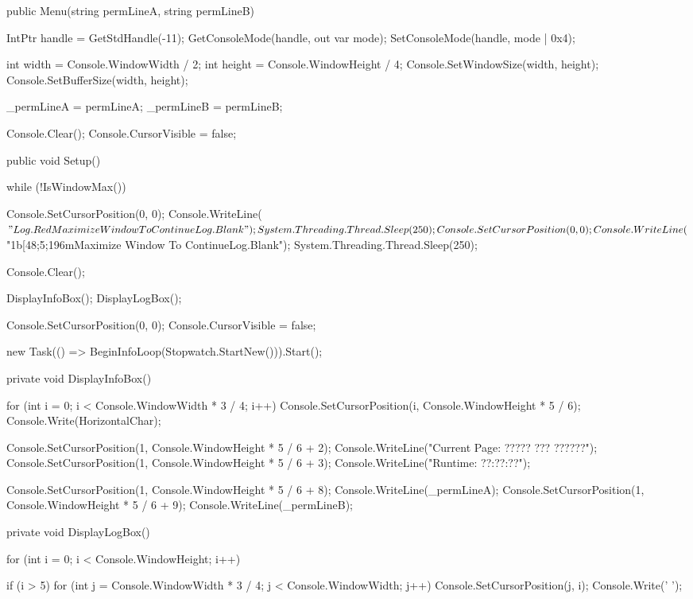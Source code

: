 \begin{flushleft}
\begin{cscode}
{    public Menu(string permLineA, string permLineB)
    {
        IntPtr handle = GetStdHandle(-11);
        GetConsoleMode(handle, out var mode);
        SetConsoleMode(handle, mode | 0x4);

        int width = Console.WindowWidth / 2;
        int height = Console.WindowHeight / 4;
        Console.SetWindowSize(width, height);
        Console.SetBufferSize(width, height);

        _permLineA = permLineA;
        _permLineB = permLineB;

        Console.Clear();
        Console.CursorVisible = false;
    }

    public void Setup()
    {
        while (!IsWindowMax())
        {
            Console.SetCursorPosition(0, 0);
            Console.WriteLine($"{Log.Red}Maximize Window To Continue{Log.Blank}");
            System.Threading.Thread.Sleep(250);
            Console.SetCursorPosition(0, 0);
            Console.WriteLine($"\x1b[48;5;196mMaximize Window To Continue{Log.Blank}");
            System.Threading.Thread.Sleep(250);

        }

        Console.Clear();

        DisplayInfoBox();
        DisplayLogBox();

        Console.SetCursorPosition(0, 0);
        Console.CursorVisible = false;

        new Task(() => BeginInfoLoop(Stopwatch.StartNew())).Start();
    }

    private void DisplayInfoBox()
    {
        for (int i = 0; i < Console.WindowWidth * 3 / 4; i++)
        {
            Console.SetCursorPosition(i, Console.WindowHeight * 5 / 6);
            Console.Write(HorizontalChar);
        }

        Console.SetCursorPosition(1, Console.WindowHeight * 5 / 6 + 2);
        Console.WriteLine("Current Page: ????? ??? ??????");
        Console.SetCursorPosition(1, Console.WindowHeight * 5 / 6 + 3);
        Console.WriteLine("Runtime:       ??:??:??");

        Console.SetCursorPosition(1, Console.WindowHeight * 5 / 6 + 8);
        Console.WriteLine(_permLineA);
        Console.SetCursorPosition(1, Console.WindowHeight * 5 / 6 + 9);
        Console.WriteLine(_permLineB);
    }

    private void DisplayLogBox()
    {
        for (int i = 0; i < Console.WindowHeight; i++)
        {
            if (i > 5)
            {
                for (int j = Console.WindowWidth * 3 / 4; j < Console.WindowWidth; j++)
                {
                    Console.SetCursorPosition(j, i);
                    Console.Write(' ');
                }
            }

}}}
\end{cscode}
\end{flushleft}
